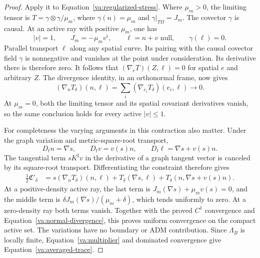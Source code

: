 \begin{proof}
Apply it to Equation~\eqref{va:regularized-stress}.  Where \(\mu_m>0\),
the limiting tensor is \(T=\gamma\otimes\gamma/\mu_m\), where
\(\gamma(n)=\mu_m\) and \(\gamma|_{T\Omega}=J_m\).
The covector \(\gamma\) is causal.  At an active ray with positive
\(\mu_m\), one has
\[
 |v|=1,\qquad J_m=-\mu_m v^\flat,\qquad
 \ell=n+v\text{ null},\qquad \gamma(\ell)=0.
\]
Parallel transport \(\ell\) along any spatial curve.  Its pairing with
the causal covector field \(\gamma\) is nonnegative and vanishes at
the point under consideration.  Its derivative there is therefore zero.
It follows that
\((\nabla_eT)(Z,\ell)=0\) for spatial \(e\) and arbitrary \(Z\).
The divergence identity, in an orthonormal frame, now gives
\begin{equation}\label{va:normal-divergence}
 (\nabla_nT_\delta)(n,\ell)
       =\sum_i(\nabla_{e_i}T_\delta)(e_i,\ell)\longrightarrow0.
\end{equation}
At \(\mu_m=0\), both the limiting tensor and its spatial covariant
derivatives vanish, so the same conclusion holds for every active
\(|v|\le1\).

For completeness the varying arguments in this contraction also matter.
Under the graph variation and metric-square-root transport,
\[
 D_tn=\nabla s,\qquad D_tv=v(s)n,\qquad
 D_t\ell=\nabla s+v(s)n.
\]
The tangential term \(sK^\sharp v\) in the derivative of a graph tangent
vector is canceled by its square-root transport.  Differentiating the
constraint therefore gives
\begin{align*}
 \tfrac12\mathfrak C'_\delta
 &=s(\nabla_nT_\delta)(n,\ell)
       +T_\delta(\nabla s,\ell)
       +T_\delta(n,\nabla s+v(s)n).
\end{align*}
At a positive-density active ray, the last term is
\(J_m(\nabla s)+\mu_m v(s)=0\), and the middle term is
\(\delta J_m(\nabla s)/(\mu_m+\delta)\), which tends uniformly to zero.
At a zero-density ray both terms vanish.  Together with the proved
\(C^1\) convergence and Equation~\eqref{va:normal-divergence}, this
proves uniform convergence on the compact active set.  The variations
have no boundary or ADM contribution.  Since \(\Lambda_B\) is locally
finite, Equation~\eqref{va:multiplier} and dominated convergence give
Equation~\eqref{va:averaged-trace}.
\end{proof}

